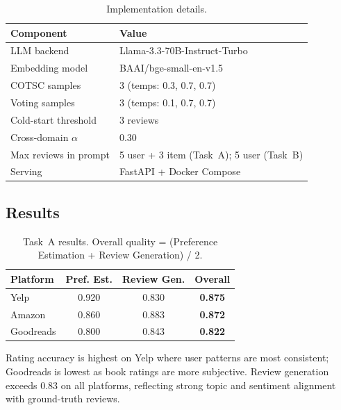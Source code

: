 \documentclass[11pt]{article}
\begin{document}
\begin{table}[h]
\centering
\small
\begin{tabular}{l p{4.2cm}}
\toprule
\textbf{Component} & \textbf{Value} \\
\midrule
LLM backend & Llama-3.3-70B-Instruct-Turbo \\

Embedding model & BAAI/bge-small-en-v1.5 \\

COTSC samples & 3 (temps: 0.3, 0.7, 0.7) \\

Voting samples & 3 (temps: 0.1, 0.7, 0.7) \\

Cold-start threshold & 3 reviews \\

Cross-domain $\alpha$ & 0.30 \\

Max reviews in prompt &
5 user + 3 item (Task~A); 
5 user (Task~B) \\

Serving & FastAPI + Docker Compose \\
\bottomrule
\end{tabular}
\caption{Implementation details.}
\label{tab:impl}
\end{table}

\subsection{Results}

\begin{table}[h]
\centering
\small
\begin{tabular}{lccc}
\toprule
\textbf{Platform} & \textbf{Pref. Est.} & \textbf{Review Gen.} & \textbf{Overall} \\
\midrule
Yelp      & 0.920 & 0.830 & \textbf{0.875} \\
Amazon    & 0.860 & 0.883 & \textbf{0.872} \\
Goodreads & 0.800 & 0.843 & \textbf{0.822} \\
\bottomrule
\end{tabular}
\caption{Task~A results. Overall quality = (Preference Estimation + Review Generation) / 2.}
\label{tab:task_a}
\end{table}

Rating accuracy is highest on Yelp where user patterns are most consistent; Goodreads is lowest as book ratings are more subjective. Review generation exceeds 0.83 on all platforms, reflecting strong topic and sentiment alignment with ground-truth reviews.
\end{document}
